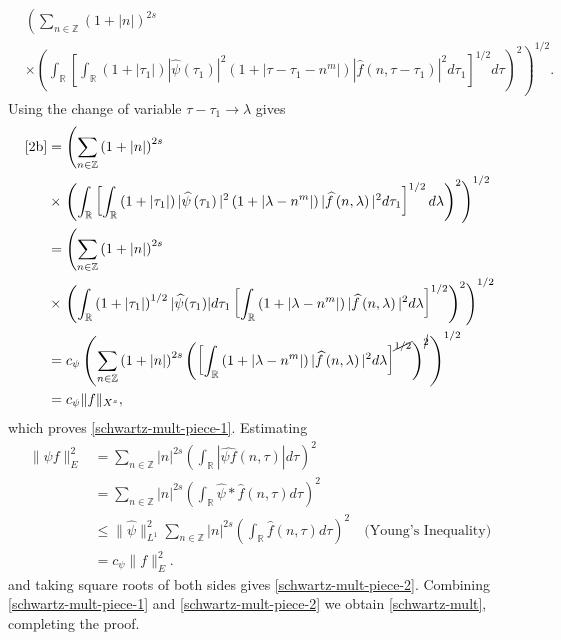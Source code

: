 \documentclass[12pt,reqno]{amsart}
\numberwithin{equation}{section}  %
\numberwithin{figure}{section}
\newcommand{\rr}{\mathbb{R}}
\newcommand{\zz}{\mathbb{Z}}
\newcommand{\wh}{\widehat}
\theoremstyle{plain}
\theoremstyle{definition}
\theoremstyle{remark}
\begin{document}
\begin{appendices}
\begin{equation}
	\label{2b}
	\begin{split}
		& \left( \sum_{n \in \zz} \left (1 + |n| \right )^{2s}  \right.
		\\
		& \times \left. \left( \int_\rr \left[ \int_\rr
		\left( 1 + | \tau_{1} | \right) | \wh{\psi}(\tau_1) |^2 \left( 1 + |
		\tau - \tau_1 - n^{m} |
		\right) | \wh{f}\left( n, \tau - \tau_1 \right) |^2 d \tau_1 
		\right]^{1/2} d \tau \right)^2 \right)^{1/2}.
	\end{split}
\end{equation}
%
%
Using the change of variable $\tau - \tau_1 \to \lambda$ gives
%
%
\begin{equation*}
	\begin{split}
		\eqref{2b}
		& = \left( \sum_{n \in \zz} \left (1 + |n| \right )^{2s}\right.
		\\
		& \times \left.  \left( \int_\rr \left[
		\int_\rr \left( 1 + | \tau_1 | \right) | \wh{\psi}\left( \tau_1
		\right) |^2 \left( 1 + | \lambda - n^{m} | \right) | \wh{f} \left( n,
		\lambda
		\right)|^2 d \tau_1 \right]^{1/2} d \lambda \right)^2 \right)^{1/2}
		\\
		& =  \left( \sum_{n \in \zz} \left (1 + |n| \right )^{2s} \right.
		\\
		& \times \left. \left( \int_\rr \left( 1 + |
		\tau_1 |
		\right)^{1/2} | \wh{\psi}(\tau_1) | d \tau_1 \left[ \int_\rr \left( 1 + |
		\lambda - n^{m} |
		\right) | \wh{f}\left( n, \lambda \right) |^2 d \lambda \right]^{1/2}
		\right)^2 \right)^{1/2}
		\\
		& = c_{\psi} \left( \sum_{n \in \zz} \left (1 + |n| \right )^{2s} \left( \left[ \int_\rr
		\left( 1 + | \lambda - n^{m} | \right) | \wh{f}\left( n, \lambda
		\right) |^2 d \lambda
		\right]^{\cancel{1/2}} \right)^{\cancel{2}} \right)^{1/2}
		\\
		& = c_{\psi} \|f\|_{X^s},
	\end{split}
\end{equation*}
%
%
which proves \eqref{schwartz-mult-piece-1}.
Estimating 
%
%
\begin{equation*}
\begin{split}
  \| \psi f \|_{E}^{2}
  & = \sum_{n \in \zz} | n |^{2s} \left( \int_{\rr} |
  \wh{\psi f}(n, \tau)
  | d \tau \right)^{2}
  \\
  & = \sum_{n \in \zz} | n |^{2s} \left( \int_{\rr} \wh{\psi} * \wh{f}
  (n, \tau) d \tau \right)^{2}
  \\
  & \le \| \wh{\psi} \|_{L^1}^{2} \sum_{n \in \zz} | n |^{2s} \left(
  \int_{\rr} \wh{f}(n, \tau) d \tau
  \right)^{2} \quad \text{(Young's Inequality)}
  \\
  & = c_{\psi} \| f \|_{E}^2.
\end{split}
\end{equation*}
%
%
and taking square roots of both sides gives \eqref{schwartz-mult-piece-2}. Combining
\eqref{schwartz-mult-piece-1} and \eqref{schwartz-mult-piece-2} we obtain
\eqref{schwartz-mult}, completing the proof.  \qquad \qedsymbol
%
%

\end{appendices}
\end{document}
